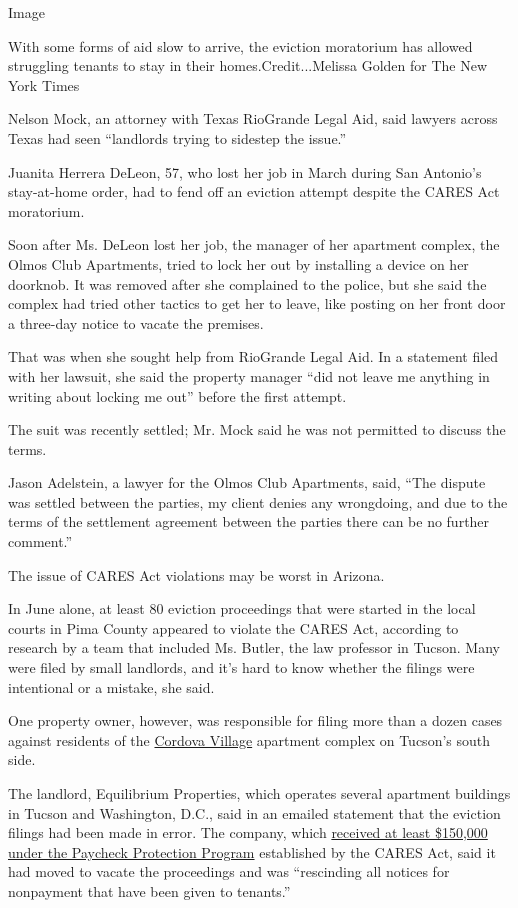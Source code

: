 Image

With some forms of aid slow to arrive, the eviction moratorium has
allowed struggling tenants to stay in their homes.Credit...Melissa
Golden for The New York Times

Nelson Mock, an attorney with Texas RioGrande Legal Aid, said lawyers
across Texas had seen ``landlords trying to sidestep the issue.''

Juanita Herrera DeLeon, 57, who lost her job in March during San
Antonio's stay-at-home order, had to fend off an eviction attempt
despite the CARES Act moratorium.

Soon after Ms. DeLeon lost her job, the manager of her apartment
complex, the Olmos Club Apartments, tried to lock her out by installing
a device on her doorknob. It was removed after she complained to the
police, but she said the complex had tried other tactics to get her to
leave, like posting on her front door a three-day notice to vacate the
premises.

That was when she sought help from RioGrande Legal Aid. In a statement
filed with her lawsuit, she said the property manager ``did not leave me
anything in writing about locking me out'' before the first attempt.

The suit was recently settled; Mr. Mock said he was not permitted to
discuss the terms.

Jason Adelstein, a lawyer for the Olmos Club Apartments, said, ``The
dispute was settled between the parties, my client denies any
wrongdoing, and due to the terms of the settlement agreement between the
parties there can be no further comment.''

The issue of CARES Act violations may be worst in Arizona.

In June alone, at least 80 eviction proceedings that were started in the
local courts in Pima County appeared to violate the CARES Act, according
to research by a team that included Ms. Butler, the law professor in
Tucson. Many were filed by small landlords, and it's hard to know
whether the filings were intentional or a mistake, she said.

One property owner, however, was responsible for filing more than a
dozen cases against residents of the
\href{https://www.equilibriumprops.com/cordova-village-apartments}{Cordova
Village} apartment complex on Tucson's south side.

The landlord, Equilibrium Properties, which operates several apartment
buildings in Tucson and Washington, D.C., said in an emailed statement
that the eviction filings had been made in error. The company, which
\href{https://projects.propublica.org/coronavirus/bailouts/loans/equilibrium-realty-llc-af99191e3bb8f54ef7b7046b9a4fe5be}{received
at least \$150,000 under the Paycheck Protection Program} established by
the CARES Act, said it had moved to vacate the proceedings and was
``rescinding all notices for nonpayment that have been given to
tenants.''

